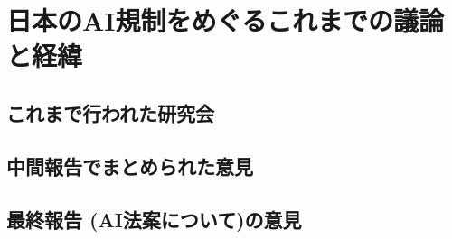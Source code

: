 \chapter{日本のAI規制をめぐるこれまでの議論と経緯}

\section{これまで行われた研究会}

\section{中間報告でまとめられた意見}

\section{最終報告 (AI法案について)の意見}
